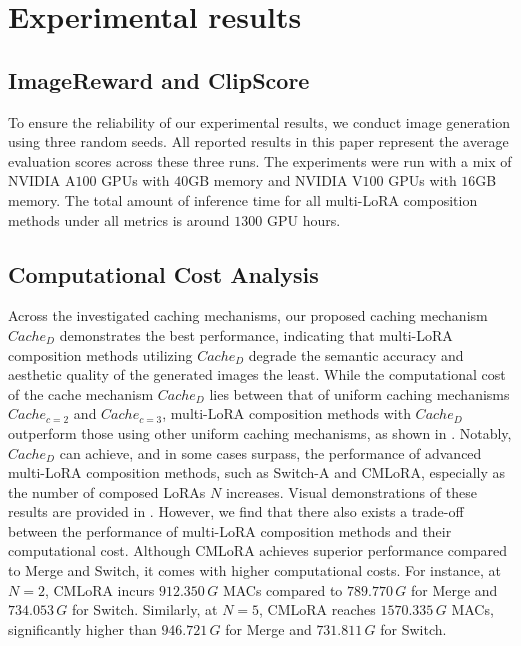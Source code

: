 \newpage
\section{Experimental results}
\label{app:results}

\subsection{ImageReward and ClipScore}
To ensure the reliability of our experimental results, we conduct image generation using three random seeds. All reported results in this paper represent the average evaluation scores across these three runs. The experiments were run with a mix of NVIDIA A$100$ GPUs with $40$GB memory and NVIDIA V$100$ GPUs with $16$GB memory. The total amount of inference time for all multi-LoRA composition methods under all metrics is around $1300$ GPU hours.





\subsection{Computational Cost Analysis}
\label{sec:computation}
Across the investigated caching mechanisms, our proposed caching mechanism $Cache_{D}$ demonstrates the best performance, indicating that multi-LoRA composition methods utilizing $Cache_{D}$ degrade the semantic accuracy and aesthetic quality of the generated images the least. While the computational cost of the cache mechanism $Cache_{D}$ lies between that of uniform caching mechanisms $Cache_{c=2}$ and $Cache_{c=3}$, multi-LoRA composition methods with $Cache_{D}$ outperform those using other uniform caching mechanisms, as shown in . Notably, $Cache_{D}$ can achieve, and in some cases surpass, the performance of advanced multi-LoRA composition methods, such as Switch-A and CMLoRA, especially as the number of composed LoRAs $N$ increases. Visual demonstrations of these results are provided in . However, we find that there also exists a trade-off between the performance of multi-LoRA composition methods and their computational cost. Although CMLoRA achieves superior performance compared to Merge and Switch, it comes with higher computational costs. For instance, at $N=2$, CMLoRA incurs $912.350 \, G$ MACs compared to $789.770 \, G$ for Merge and $734.053 \, G$ for Switch. Similarly, at $N=5$, CMLoRA reaches $1570.335 \, G$ MACs, significantly higher than $946.721 \, G$ for Merge and $731.811 \, G$ for Switch.

